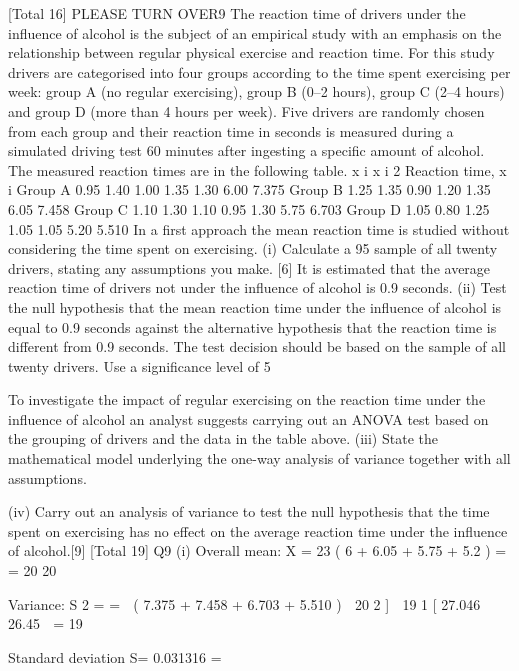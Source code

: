\documentclass[a4paper,12pt]{article}
\begin{document}
[Total 16]
PLEASE TURN OVER9
The reaction time of drivers under the influence of alcohol is the subject of an
empirical study with an emphasis on the relationship between regular physical
exercise and reaction time. For this study drivers are categorised into four groups
according to the time spent exercising per week: group A (no regular exercising),
group B (0–2 hours), group C (2–4 hours) and group D (more than 4 hours per week).
Five drivers are randomly chosen from each group and their reaction time in seconds
is measured during a simulated driving test 60 minutes after ingesting a specific
amount of alcohol. The measured reaction times are in the following table.
\sum x i \sum x i 2
Reaction time, x i
Group A 0.95 1.40 1.00 1.35 1.30 6.00 7.375
Group B 1.25 1.35 0.90 1.20 1.35 6.05 7.458
Group C 1.10 1.30 1.10 0.95 1.30 5.75 6.703
Group D 1.05 0.80 1.25 1.05 1.05 5.20 5.510
In a first approach the mean reaction time is studied without considering the time
spent on exercising.
(i)
Calculate a 95%
sample of all twenty drivers, stating any assumptions you make.
[6]
It is estimated that the average reaction time of drivers not under the influence of
alcohol is 0.9 seconds.
(ii)
Test the null hypothesis that the mean reaction time under the influence of
alcohol is equal to 0.9 seconds against the alternative hypothesis that the
reaction time is different from 0.9 seconds. The test decision should be based
on the sample of all twenty drivers. Use a significance level of 5%

To investigate the impact of regular exercising on the reaction time under the
influence of alcohol an analyst suggests carrying out an ANOVA test based on the
grouping of drivers and the data in the table above.
(iii) State the mathematical model underlying the one-way analysis of variance
together with all assumptions.

(iv) Carry out an analysis of variance to test the null hypothesis that the time spent
on exercising has no effect on the average reaction time under the influence of
alcohol.[9]
[Total 19]
Q9
(i)
Overall mean: X \;=
23
( 6 + 6.05 + 5.75 + 5.2 ) \;=\; \;=
20
20

Variance:
S 2 \;=\;
\;= 
( 7.375 + 7.458 + 6.703 + 5.510 )  20  2 \right]

19
1
[ 27.046  26.45  \;=
19

Standard deviation
S= 0.031316 \;=
\end{document}

